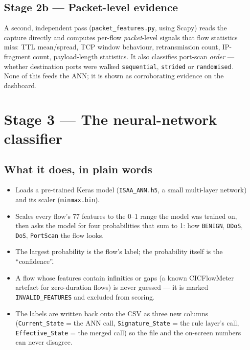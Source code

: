 \documentclass[11pt,a4paper]{article}
\begin{document}
\subsection{Stage 2b --- Packet-level evidence}
A second, independent pass (\texttt{packet\_features.py}, using Scapy) reads the
capture directly and computes per-flow \emph{packet}-level signals that flow
statistics miss: TTL mean/spread, TCP window behaviour, retransmission count,
IP-fragment count, payload-length statistics. It also classifies port-scan
\emph{order} --- whether destination ports were walked \texttt{sequential},
\texttt{strided} or \texttt{randomised}. None of this feeds the ANN; it is
shown as corroborating evidence on the dashboard.

\section{Stage 3 --- The neural-network classifier}

\subsection*{What it does, in plain words}
\begin{itemize}
\item Loads a pre-trained Keras model (\texttt{ISAA\_ANN.h5}, a small
  multi-layer network) and its scaler (\texttt{minmax.bin}).
\item Scales every flow's 77 features to the 0--1 range the model was trained
  on, then asks the model for four probabilities that sum to 1: how
  \texttt{BENIGN}, \texttt{DDoS}, \texttt{DoS}, \texttt{PortScan} the flow looks.
\item The largest probability is the flow's label; the probability itself is the
  ``confidence''.
\item A flow whose features contain infinities or gaps (a known CICFlowMeter
  artefact for zero-duration flows) is never guessed --- it is marked
  \texttt{INVALID\_FEATURES} and excluded from scoring.
\item The labels are written back onto the CSV as three new columns
  (\texttt{Current\_State} = the ANN call, \texttt{Signature\_State} = the rule
  layer's call, \texttt{Effective\_State} = the merged call) so the file and the
  on-screen numbers can never disagree.
\end{itemize}
\end{document}
